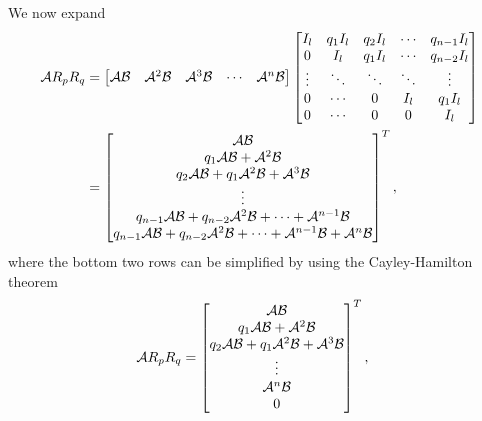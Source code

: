\begin{appendices}
We now expand
\begin{equation*}
    \begin{split}
        \mathcal{A} R_pR_q &= 
        \begin{bmatrix}
            \mathcal{A}\mathcal{B} & \mathcal{A}^2\mathcal{B} & \mathcal{A}^{3}\mathcal{B} & \cdots & \mathcal{A}^{n}\mathcal{B} \\
        \end{bmatrix}
        \begin{bmatrix}
            I_l & q_1I_l & q_2I_l & \cdots & q_{n-1}I_l \\
            0 & I_l & q_1I_l & \cdots & q_{n-2}I_l \\
            \vdots & \ddots & \ddots & \ddots & \vdots \\
            0 & \cdots & 0 & I_l & q_1I_l \\
            0 & \cdots & 0 & 0 & I_l \\
        \end{bmatrix} \\
        &=
        \begin{bmatrix}
            \mathcal{A} \mathcal{B} \\ 
            q_1 \mathcal{A} \mathcal{B} + \mathcal{A}^2 \mathcal{B} \\ 
            q_2 \mathcal{A} \mathcal{B} + q_1 \mathcal{A}^2 \mathcal{B} + \mathcal{A}^3 \mathcal{B} \\ \vdots \\ 
            q_{n-1} \mathcal{A} \mathcal{B} + q_{n-2} \mathcal{A}^2 \mathcal{B} + \cdots + \mathcal{A}^{n-1} \mathcal{B} \\
            q_{n-1} \mathcal{A} \mathcal{B} + q_{n-2} \mathcal{A}^2 \mathcal{B} + \cdots + \mathcal{A}^{n-1} \mathcal{B} + \mathcal{A}^n \mathcal{B} \\
        \end{bmatrix}^T,
    \end{split}
\end{equation*}
where the bottom two rows can be simplified by using the Cayley-Hamilton theorem
\begin{equation*}
    \begin{split}
        \mathcal{A} R_pR_q &= 
        \begin{bmatrix}
            \mathcal{A}\mathcal{B} \\ 
            q_1\mathcal{A}\mathcal{B} + \mathcal{A}^2\mathcal{B} \\ 
            q_2\mathcal{A}\mathcal{B} + q_1\mathcal{A}^2\mathcal{B} + \mathcal{A}^3\mathcal{B} \\ \vdots \\ 
            \mathcal{A}^{n}\mathcal{B} \\
            0 \\
        \end{bmatrix}^T,
    \end{split}
\end{equation*}

\end{appendices}
